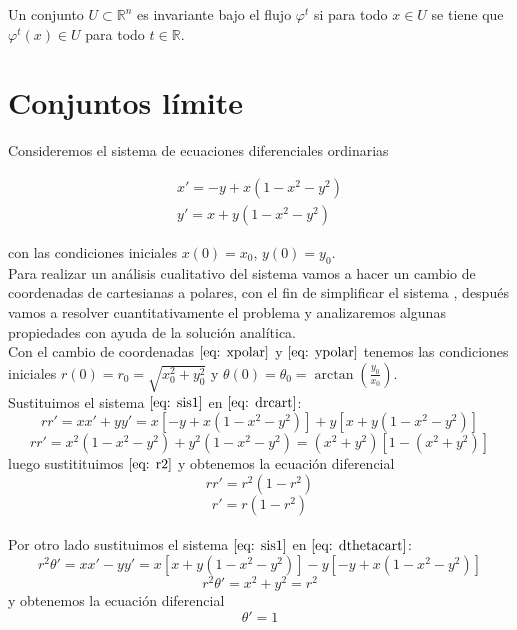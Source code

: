 \begin{definition}
	Un conjunto $U\subset\mathbb{R}^n$ es invariante bajo el flujo $\varphi^t$ si para todo $x\in U$ se tiene que $\varphi^t(x)\in U$ para todo $t\in\mathbb{R}$.
\end{definition}

\section{Conjuntos límite}

Consideremos el sistema de ecuaciones diferenciales ordinarias

\begin{equation}\label{eq: sis1}
	\begin{matrix}
		x'=-y+x(1-x^2-y^2) \\
		y'=x+y(1-x^2-y^2)
	\end{matrix}
\end{equation}

con las condiciones iniciales $x(0)=x_0$, $y(0)=y_0$.\\

Para realizar un análisis cualitativo del sistema vamos a hacer un cambio
de coordenadas de cartesianas a polares, con el fin de simplificar
el sistema \cite{perko2001differential}, después vamos a resolver cuantitativamente el problema y
analizaremos algunas propiedades con ayuda de la solución analítica.\\

Con el cambio de coordenadas $\eqref{eq: xpolar}$ y  $\eqref{eq: ypolar}$ tenemos
las condiciones iniciales $r(0)=r_0=\sqrt{x_0^2+y_0^2}$ y $\theta(0)=\theta_0=\arctan(\frac{y_0}{x_0})$.\\

Sustituimos el sistema $\eqref{eq: sis1}$ en $\eqref{eq: drcart}$:
$$rr'=xx'+yy'=x[-y+x(1-x^2-y^2)]+y[x+y(1-x^2-y^2)]$$
$$rr'=x^2(1-x^2-y^2)+y^2(1-x^2-y^2)=(x^2+y^2)[1-(x^2+y^2)]$$
luego sustitituimos $\eqref{eq: r2}$ y obtenemos la ecuación diferencial
$$rr'=r^2(1-r^2)$$
\begin{equation}\label{eq: drsis1}
	r'=r(1-r^2)
\end{equation}\\

Por otro lado sustituimos el sistema $\eqref{eq: sis1}$ en $\eqref{eq: dthetacart}$:
$$r^2\theta'=xx'-yy'=x[x+y(1-x^2-y^2)]-y[-y+x(1-x^2-y^2)]$$
$$r^2\theta'=x^2+y^2=r^2$$
y obtenemos la ecuación diferencial
\begin{equation}\label{eq: dthetasis1}
	\theta'=1
\end{equation}

